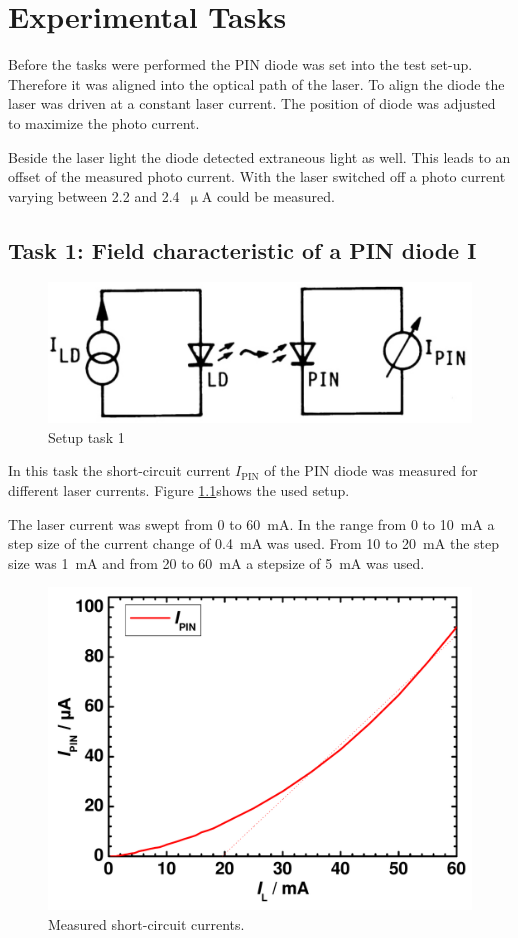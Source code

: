 \chapter{Experimental Tasks}

Before the tasks were performed the PIN diode was set into the test set-up. Therefore it was aligned into the optical path of the laser. To align the diode the laser was driven at a constant laser current. The position of diode was adjusted to maximize the photo current. 


Beside the laser light the diode detected extraneous light as well. This leads to an offset of the measured photo current. With the laser switched off a photo current varying between 2.2 and 2.4~$\upmu$A could be measured.

\section{Task 1: Field characteristic of a PIN diode I}
\label{T1}
\begin{figure}%
\centering
\includegraphics[width=.5\columnwidth]{Grafiken/T1_setup.jpg}%
\caption{Setup task 1}%
\label{fig:T1_setup}%
\end{figure}
In this task the short-circuit current $I_{\mathrm{PIN}}$ of the PIN diode was measured for different laser currents. Figure \ref{fig:T1_setup}\footnotemark[3] shows the used setup. 

The laser current was swept from 0 to 60~mA. In the range from 0 to 10~mA a step size of the current change of 0.4~mA was used. From 10 to 20~mA the step size was 1~mA and from 20 to 60~mA a stepsize of 5~mA was used. 

\begin{figure}%
\centering
\includegraphics[width=.5\columnwidth]{Grafiken/T1_laser.pdf}%
\caption{Measured short-circuit currents.}%
\label{fig:T1_laser}%
\end{figure}

